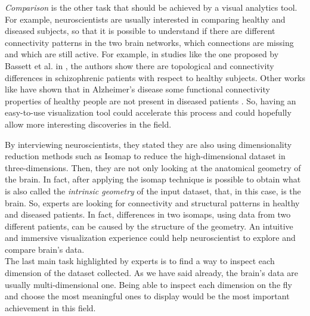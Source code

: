 \documentclass{article}
\begin{document}
\begin{multicols}{2}
\textit{Comparison} is the other task that should be achieved by a visual analytics tool. For example, neuroscientists are usually interested in comparing healthy and diseased subjects, so that it is possible to understand if there are different connectivity patterns in the two brain networks, which connections are missing and which are still active. For example, in studies like the one proposed by Bassett et al. in \cite{hierarchicalOrganization}, the authors show there are topological and connectivity differences in schizophrenic patients with respect to healthy subjects. Other works like \cite{alzheimer} have shown that in Alzheimer's disease some functional connectivity properties of healthy people are not present in diseased patients . So, having an easy-to-use visualization tool could accelerate this process and could hopefully allow more interesting discoveries in the field.

By interviewing neuroscientists, they stated they are also using dimensionality reduction methods such as Isomap to reduce the high-dimensional dataset in three-dimensions. Then, they are not only looking at the anatomical geometry of the brain. In fact, after applying the isomap technique is possible to obtain what is also called the \textit{intrinsic geometry} of the input dataset, that, in this case, is the brain. So, experts are looking for connectivity and structural patterns in healthy and diseased patients. In fact, differences in two isomaps, using data from two different patients, can be caused by the structure of the geometry.  An intuitive and immersive visualization experience could help neuroscientist to explore and compare brain's data.
\\
The last main task highlighted by experts is to find a way to inspect each dimension of the dataset collected. As we have said already, the brain's data are usually multi-dimensional one. Being able to inspect each dimension on the fly and choose the most meaningful ones to display would be the most important achievement in this field.
%
%
%				


\end{multicols}
\end{document}
